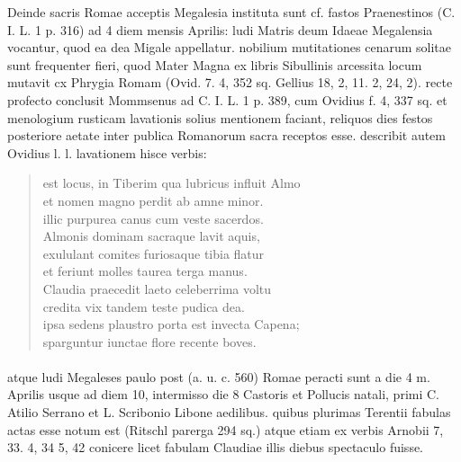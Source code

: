 \documentclass[a4paper, 11pt, oneside, polutonikogreek, german]{article}
\begin{document}
Deinde sacris Romae acceptis Megalesia instituta sunt cf. fastos Praenestinos (C. I. L. 1 p. 316) ad 4 diem mensis Aprilis: ludi Matris deum Idaeae Megalensia vocantur, quod ea dea Migale appellatur. nobilium mutitationes cenarum solitae sunt frequenter fieri, quod Mater Magna ex libris Sibullinis arcessita locum mutavit cx Phrygia Romam (Ovid. 7. 4, 352 sq. Gellius 18, 2, 11. 2, 24, 2). recte profecto conclusit Mommsenus ad C. I. L. 1 p. 389, cum Ovidius f. 4, 337 sq. et menologium rusticam lavationis solius mentionem faciant, reliquos dies festos posteriore aetate inter publica Romanorum sacra receptos esse. describit autem Ovidius l. l. lavationem hisce verbis:
\begin{quotation}
est locus, in Tiberim qua lubricus influit Almo\\\hspace*{10mm}et nomen magno perdit ab amne minor.\\\hspace*{5mm}illic purpurea canus cum veste sacerdos.\\\hspace*{10mm}Almonis dominam sacraque lavit aquis,\\\hspace*{5mm}exululant comites furiosaque tibia flatur\\\hspace*{10mm}et feriunt molles taurea terga manus.\\\hspace*{5mm}Claudia praecedit laeto celeberrima voltu\\\hspace*{10mm}credita vix tandem teste pudica dea.\\\hspace*{5mm}ipsa sedens plaustro porta est invecta Capena;\\\hspace*{10mm}sparguntur iunctae flore recente boves.
\end{quotation}
\paragraph{}
atque ludi Megaleses paulo post (a. u. c. 560) Romae peracti sunt a die 4 m. Aprilis usque ad diem 10, intermisso die 8 Castoris et Pollucis natali, primi C. Atilio Serrano et L. Scribonio Libone aedilibus. quibus plurimas Terentii fabulas actas esse notum est (Ritschl parerga 294 sq.) atque etiam ex verbis Arnobii 7, 33. 4, 34 5, 42 conicere licet fabulam Claudiae illis diebus spectaculo fuisse.
\end{document}
